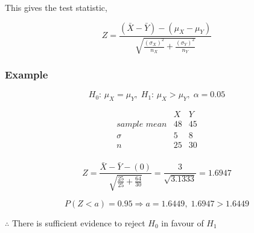 \documentclass{article}
\begin{document}

\noindent This gives the test statistic,

\[Z = \frac{\left(\bar{X} - \bar{Y}\right) - \left(\mu_X - \mu_Y\right)}
{\sqrt{\frac{\left(\sigma_X\right)^2}{n_X} +
\frac{\left(\sigma_Y\right)^2}{n_Y}}}\]

\subsubsection{Example}

\[H_0:\, \mu_X = \mu_Y,\; H_1:\, \mu_X > \mu_Y,\; \alpha = 0.05\]

\[\begin{array}{ccc}
    
                         & X  & Y \\
    \textit{sample mean} & 48 & 45 \\
    \sigma               & 5  & 8 \\
    n                    & 25 & 30 \\

\end{array}\]

\[Z = \frac{\bar{X} - \bar{Y} - (0)}{\sqrt{\frac{25}{25} + \frac{64}{30}}} =
\frac{3}{\sqrt{3.1333}} = 1.6947\]

\[P\left(Z < a\right) = 0.95 \Rightarrow a = 1.6449,\; 1.6947 > 1.6449\]

\noindent $\therefore$ There is sufficient evidence to reject $H_0$ in favour of
$H_1$
\end{document}
